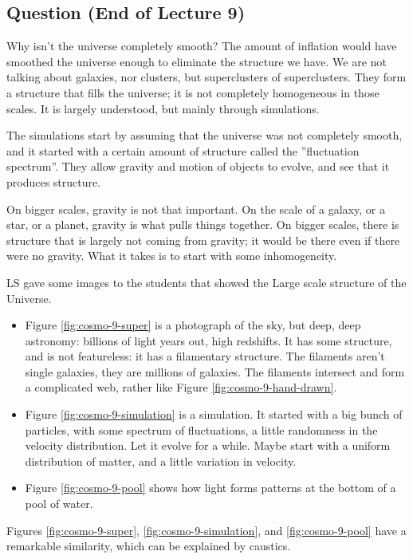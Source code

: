 \documentclass[]{article}
\begin{document}
\subsection{Question (End of Lecture 9)}

Why isn't the universe completely smooth? The amount of inflation would have smoothed the universe enough to eliminate the structure we have. We are not talking about galaxies, nor clusters, but superclusters of superclusters. They form a structure that fills the universe; it is not completely homogeneous in those scales. It is largely understood, but mainly through simulations.

The simulations start by assuming that the universe was not completely smooth, and it started with a certain amount of structure called the ''fluctuation spectrum''. They allow gravity and motion of objects to evolve, and see that it produces structure. 

On bigger scales, gravity is not that important. On the scale of a galaxy, or a star, or a planet, gravity is what pulls things together. On bigger scales, there is structure that is largely not coming from gravity; it would be there even if there were no gravity. What it takes is to start with some inhomogeneity.

LS gave some images to the students that showed the Large scale structure of the Universe. 

\begin{itemize}
	\item Figure \ref{fig:cosmo-9-super} is a photograph of the sky, but deep, deep astronomy: billions of light years out, high redshifts. It has some structure, and is not featureless: it has a filamentary structure. The filaments aren't single galaxies, they are millions of galaxies. The filaments intersect and form a complicated web, rather like Figure \ref{fig:cosmo-9-hand-drawn}. 

	\item Figure \ref{fig:cosmo-9-simulation} is a simulation. It started with a big bunch of particles, with some spectrum of fluctuations, a little randomness in the velocity distribution. Let it evolve for a while. Maybe start with a uniform distribution of matter, and a little variation in velocity. 

	\item Figure \ref{fig:cosmo-9-pool} shows how light forms patterns at the bottom of a pool of water.
\end{itemize}
 
Figures \ref{fig:cosmo-9-super}, \ref{fig:cosmo-9-simulation}, and \ref{fig:cosmo-9-pool} have a remarkable similarity, which can be explained by caustics.
\end{document}

